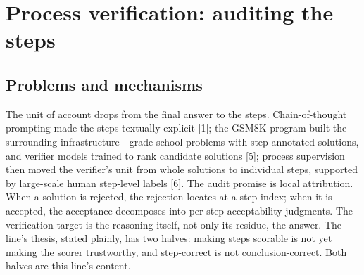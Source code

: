 \documentclass[11pt]{article}
\begin{document}
\section{Process verification: auditing the steps}
\label{sec:4}
\subsection{Problems and mechanisms}
\noindent The unit of account drops from the final answer to the steps. Chain-of-thought prompting made the steps textually explicit [1]; the GSM8K program built the surrounding infrastructure—grade-school problems with step-annotated solutions, and verifier models trained to rank candidate solutions [5]; process supervision then moved the verifier's unit from whole solutions to individual steps, supported by large-scale human step-level labels [6]. The audit promise is local attribution. When a solution is rejected, the rejection locates at a step index; when it is accepted, the acceptance decomposes into per-step acceptability judgments. The verification target is the reasoning itself, not only its residue, the answer. The line's thesis, stated plainly, has two halves: making steps scorable is not yet making the scorer trustworthy, and step-correct is not conclusion-correct. Both halves are this line's content.\par
\end{document}
